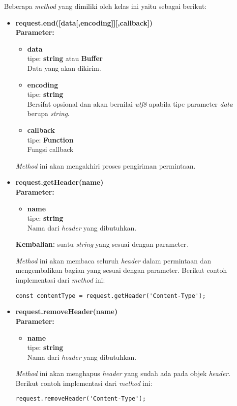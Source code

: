 \begin{enumerate}
	Beberapa \textit{method} yang dimiliki oleh kelas ini yaitu sebagai berikut:
	\begin{itemize}
		\item \textbf{request.end([data[,encoding]][,callback])} \\ 
		\textbf{Parameter:} 
		\begin{itemize}
			\item \textbf{data} \\tipe: \textbf{string} atau \textbf{Buffer} \\ Data yang akan dikirim.
			\item \textbf{encoding} \\tipe: \textbf{string} \\ Bersifat opsional dan akan bernilai \textit{utf8} apabila tipe parameter \textit{data} berupa \textit{string}.
			\item \textbf{callback} \\tipe:	\textbf{Function} \\ Fungsi callback
		\end{itemize}
		
		\textit{Method} ini akan mengakhiri proses pengiriman permintaan.
		
		\item \textbf{request.getHeader(name)} \\
		\textbf{Parameter:} 
		\begin{itemize}
			\item \textbf{name} \\tipe: \textbf{string} \\ Nama dari \textit{header} yang dibutuhkan.
		\end{itemize}
		\textbf{Kembalian:} suatu \textit{string} yang sesuai dengan parameter.
		
		\textit{Method} ini akan membaca seluruh \textit{header} dalam permintaan dan mengembalikan bagian yang sesuai dengan parameter. Berikut contoh implementasi dari \textit{method} ini:
\begin{lstlisting}
const contentType = request.getHeader('Content-Type');
\end{lstlisting}
		
		\item \textbf{request.removeHeader(name)} \\ 
		\textbf{Parameter:}
		\begin{itemize}
			\item \textbf{name} \\tipe: \textbf{string} \\ Nama dari \textit{header} yang dibutuhkan.
		\end{itemize}
		\textit{Method} ini akan menghapus \textit{header} yang sudah ada pada objek \textit{header}. Berikut contoh implementasi dari \textit{method} ini:
\begin{lstlisting}
request.removeHeader('Content-Type');
\end{lstlisting}
		

\end{itemize}
\end{enumerate}
